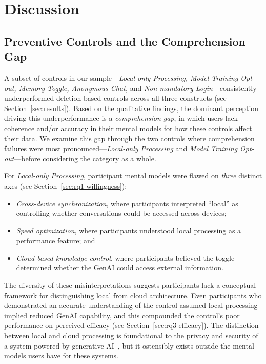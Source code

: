 \documentclass[letterpaper,twocolumn,10pt]{article}
\begin{document}
\section{Discussion}
\subsection{Preventive Controls and the Comprehension Gap}
\label{sec:comprehension-gap}

A subset of controls in our sample---\textit{Local-only Processing, Model Training Opt-out, Memory Toggle, Anonymous Chat,} and \textit{Non-mandatory Login}---consistently underperformed deletion-based controls across all three constructs (see Section~\ref{sec:results}). Based on the qualitative findings, the dominant perception driving this underperformance is a \textit{comprehension gap}, in which users lack coherence and/or accuracy in their mental models for how these controls affect their data. We examine this gap through the two controls where comprehension failures were most pronounced---\textit{Local-only Processing} and \textit{Model Training Opt-out}---before considering the category as a whole.

For \emph{Local-only Processing}, participant mental models were flawed on \textit{three} distinct axes (see Section~\ref{sec:rq1-willingness}):
\begin{itemize}
    \item \textit{Cross-device synchronization}, where participants interpreted ``local'' as controlling whether conversations could be accessed across devices;
    \item \textit{Speed optimization}, where participants understood local processing as a performance feature; and
    \item \textit{Cloud-based knowledge control}, where participants believed the toggle determined whether the GenAI could access external information.
\end{itemize}

The diversity of these misinterpretations suggests participants lack a conceptual framework for distinguishing local from cloud architecture. Even participants who demonstrated an accurate understanding of the control assumed local processing implied reduced GenAI capability, and this compounded the control's poor performance on perceived efficacy (see Section~\ref{sec:rq3-efficacy}). The distinction between local and cloud processing is foundational to the privacy and security of a system powered by generative AI~\cite{xu2024device}, but it ostensibly exists outside the mental models users have for these systems.
\end{document}
